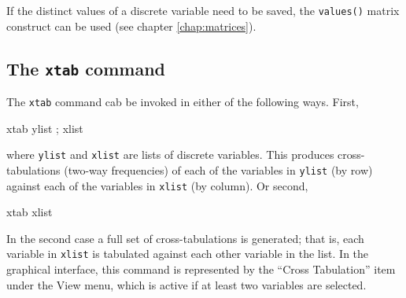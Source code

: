 If the distinct values of a discrete variable need to be saved, the
\texttt{values()} matrix construct can be used (see chapter
\ref{chap:matrices}).

\subsection{The \texttt{xtab} command}
\label{discr-xtab}

The \texttt{xtab} command cab be invoked in either of the following
ways.  First,
%
\begin{code}
xtab ylist ; xlist
\end{code}
%
where \texttt{ylist} and \texttt{xlist} are lists of discrete
variables.  This produces cross-tabulations (two-way frequencies) of
each of the variables in \texttt{ylist} (by row) against each of the
variables in \texttt{xlist} (by column).  Or second,
%
\begin{code}
xtab xlist
\end{code}
%
In the second case a full set of cross-tabulations is generated; that
is, each variable in \texttt{xlist} is tabulated against each other
variable in the list.  In the graphical interface, this command is
represented by the ``Cross Tabulation'' item under the View menu,
which is active if at least two variables are selected.


